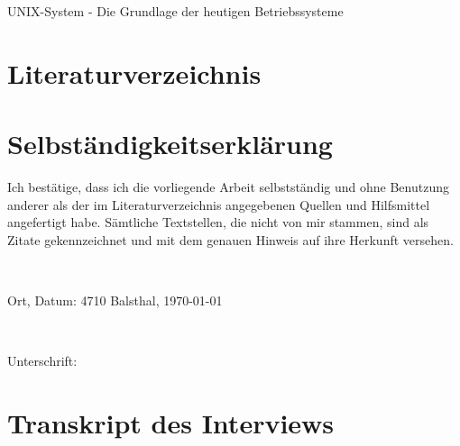 \documentclass[a4paper, 11pt]{article}
\begin{document}
    \begin{titlepage}
        \centering
        \vspace*{120pt}
        \LARGE UNIX-System - Die Grundlage der heutigen Betriebssysteme \par
        \vspace{0.5cm}
        \Large \subtitle{wissenschaftliche Arbeit} \par
        \vfill
    \end{titlepage}
    \newpage


    
    \newpage


    \tableofcontents
    \newpage


    
    \newpage


    
    \newpage


    
    \newpage


    
    \newpage


    
    \newpage


    
    \newpage


    \section{Literaturverzeichnis}
    \printbibliography[heading=none]
    \nocite{*}
    \newpage


    \section{Selbständigkeitserklärung}
    Ich bestätige, dass ich die vorliegende Arbeit selbstständig und ohne Benutzung anderer als der im Literaturverzeichnis angegebenen Quellen und Hilfsmittel angefertigt habe.
    Sämtliche Textstellen, die nicht von mir stammen, sind als Zitate gekennzeichnet und mit dem genauen Hinweis auf ihre Herkunft versehen.

    \

    Ort, Datum: \hspace{120pt} 4710 Balsthal, \today

    \

    Unterschrift:
    \newpage


    \appendix
    \section{Transkript des Interviews}
    
\end{document}
